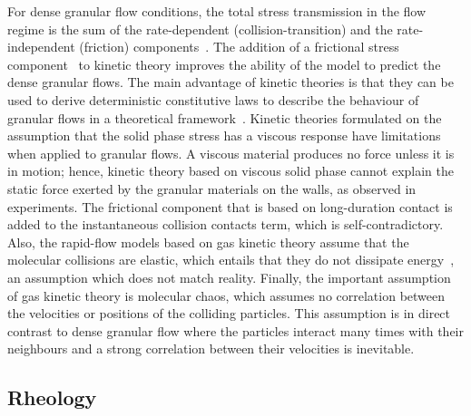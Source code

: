 For dense granular flow conditions, the total stress transmission in the flow 
regime is the sum of the rate-dependent (collision-transition) and the 
rate-independent (friction) components~\citep{Ng2008}. The addition of a 
frictional stress component~\citep{Schaeffer1987} to kinetic theory improves 
the ability of the model to predict the dense granular flows. The main 
advantage of kinetic theories is that they can be used to derive deterministic 
constitutive laws to describe the behaviour of granular flows in a theoretical 
framework~\citep{Jenkins1983}. Kinetic theories formulated on the assumption 
that the solid phase stress has a viscous response have limitations when 
applied to granular flows. A viscous material produces no force unless it is in 
motion; hence, kinetic theory based on viscous solid phase cannot explain the 
static force exerted by the granular materials on the walls, as observed in 
experiments. The frictional component that is based on long-duration contact is 
added to the instantaneous collision contacts term, which is 
self-contradictory. 
Also, the rapid-flow models based on gas 
kinetic theory assume that the molecular collisions are elastic, which entails 
that they do not dissipate energy~\citep{Campbell2006}, an assumption which 
does not match reality. Finally, the important assumption of gas kinetic theory 
is molecular chaos, which assumes no correlation between the velocities or 
positions of the colliding particles. This assumption is in direct contrast to 
dense granular flow where the particles interact many times with their 
neighbours and a strong correlation between their velocities is inevitable.

\subsection{Rheology}
\label{sec:muI}

